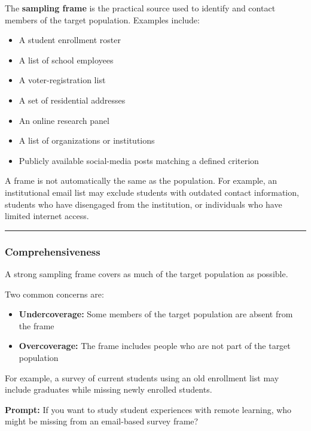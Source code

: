 \documentclass[
  letterpaper,
  DIV=11,
  numbers=noendperiod]{scrartcl}
\providecommand{\tightlist}{%
  \setlength{\itemsep}{0pt}\setlength{\parskip}{0pt}}\usepackage{longtable,booktabs,array}
\begin{document}
The \textbf{sampling frame} is the practical source used to identify and
contact members of the target population. Examples include:

\begin{itemize}
\tightlist
\item
  A student enrollment roster
\item
  A list of school employees
\item
  A voter-registration list
\item
  A set of residential addresses
\item
  An online research panel
\item
  A list of organizations or institutions
\item
  Publicly available social-media posts matching a defined criterion
\end{itemize}

A frame is not automatically the same as the population. For example, an
institutional email list may exclude students with outdated contact
information, students who have disengaged from the institution, or
individuals who have limited internet access.

\begin{center}\rule{0.5\linewidth}{0.5pt}\end{center}

\subsubsection{Comprehensiveness}\label{comprehensiveness}

A strong sampling frame covers as much of the target population as
possible.

Two common concerns are:

\begin{itemize}
\tightlist
\item
  \textbf{Undercoverage:} Some members of the target population are
  absent from the frame
\item
  \textbf{Overcoverage:} The frame includes people who are not part of
  the target population
\end{itemize}

For example, a survey of current students using an old enrollment list
may include graduates while missing newly enrolled students.

\textbf{Prompt:} If you want to study student experiences with remote
learning, who might be missing from an email-based survey frame?
\end{document}

